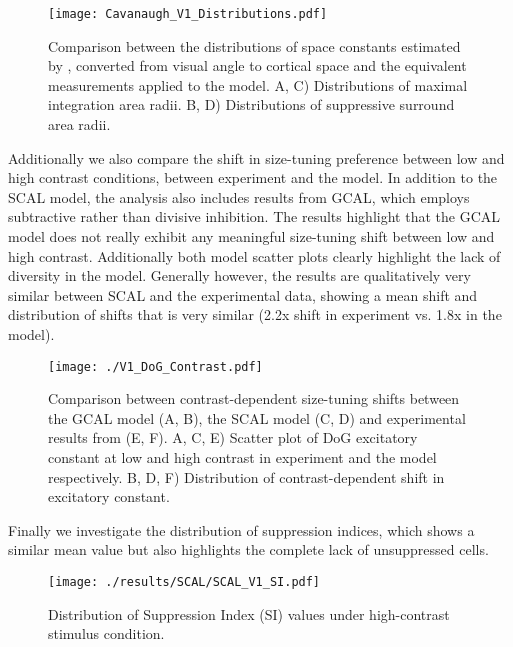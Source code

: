 \begin{figure}
	\centering
        \texttt{[image: Cavanaugh\_V1\_Distributions.pdf]}
	\caption[Distribution of V1 Difference-of-Gaussian space constants
      measured by \cite{Cavanaugh2002} compared to SCAL
      model.]{Comparison between the distributions of space constants
      estimated by \cite{Cavanaugh2002}, converted from visual angle
      to cortical space and the equivalent measurements applied to the
      model. A, C) Distributions of maximal integration area radii.
      B, D) Distributions of suppressive surround area radii. }
	\label{CavanaughDistribution}
\end{figure}

Additionally we also compare the shift in size-tuning preference
between low and high contrast conditions, between experiment
\citep{Sceniak1999} and the model. In addition to the SCAL model, the
analysis also includes results from GCAL, which employs subtractive
rather than divisive inhibition. The results highlight that the GCAL
model does not really exhibit any meaningful size-tuning shift between
low and high contrast. Additionally both model scatter plots clearly
highlight the lack of diversity in the model. Generally however, the
results are qualitatively very similar between SCAL and the
experimental data, showing a mean shift and distribution of shifts
that is very similar (2.2x shift in experiment vs. 1.8x in the model).

\begin{figure}
	\centering
        \texttt{[image: ./V1\_DoG\_Contrast.pdf]}
	\caption[Contrast-dependent size-tuning shifts compared between
      GCAL, SCAL and experimental results from
      \cite{Sceniak1999}.]{Comparison between contrast-dependent 
      size-tuning shifts between the GCAL model (A, B), the SCAL model (C,
      D) and experimental results from \cite{Sceniak1999} (E, F). A,
      C, E) Scatter plot of DoG excitatory constant at low and high
      contrast in experiment and the model respectively. B, D, F)
      Distribution of contrast-dependent shift in excitatory
      constant.}
	\label{ContrastShift}
\end{figure}

Finally we investigate the distribution of suppression indices, which
shows a similar mean value but also highlights the complete lack of
unsuppressed cells.

\begin{figure}
	\centering
        \texttt{[image: ./results/SCAL/SCAL\_V1\_SI.pdf]}
	\caption{Distribution of Suppression Index (SI) values under
      high-contrast stimulus condition.}
	\label{SCALSI}
\end{figure}


